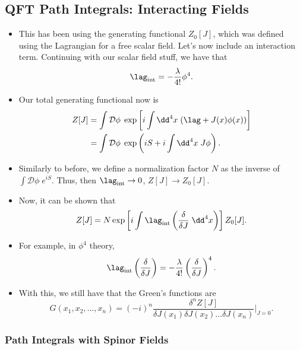 \subsection*{QFT Path Integrals: Interacting Fields}

\begin{itemize}
    \item This has been using the generating functional $Z_0[J]$, which was defined using the Lagrangian for a free scalar field. Let's now include an interaction term. Continuing with our scalar field stuff, we have that 
        \begin{equation}
            \lag_{\mathrm{int}} = -\frac{\lambda}{4!}\phi^4.
        \end{equation}
    \item Our total generating functional now is
        \begin{align}
            Z[J] &= \int\mathcal{D}\phi \; \exp\left[ i\int\dd^4x \; (\lag + J(x)\phi(x)) \right] \\
            &= \int\mathcal{D}\phi \; \exp\left( iS + i\int\dd^4x \; J\phi \right).
        \end{align}
    \item Similarly to before, we define a normalization factor $N$ as the inverse of $\int\mathcal{D}\phi \; e^{iS}$. Thus, then $\lag_{\mathrm{int}} \rightarrow 0$, $Z[J] \rightarrow Z_0[J]$.
    \item Now, it can be shown that
        \begin{equation}
            Z[J] = N \exp\left[ i\int\lag_{\mathrm{int}}\left( \frac{\delta}{\delta J} \;\dd^4x \right) \right]Z_0[J].
        \end{equation}
    \item For example, in $\phi^4$ theory,
        \begin{equation}
            \lag_{\mathrm{int}}\left( \frac{\delta}{\delta J} \right) = -\frac{\lambda}{4!}\left( \frac{\delta}{\delta J} \right)^4.
        \end{equation}
    \item With this, we still have that the Green's functions are
        \begin{equation}
            G(x_1,x_2,\ldots,x_n) = (-i)^n \frac{\delta^n Z[J]}{\delta J(x_1) \delta J(x_2) \ldots \delta J(x_n)}\bigg|_{J=0}.
        \end{equation}
\end{itemize}


\subsubsection*{Path Integrals with Spinor Fields}

